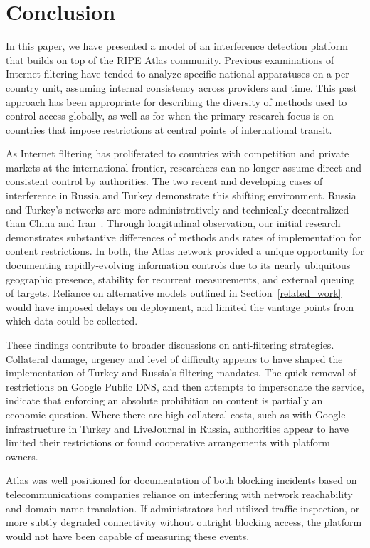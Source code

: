 \section{Conclusion}
\label{sec:conclusion}

In this paper, we have presented a model of an interference detection
platform that builds on top of the RIPE Atlas community. Previous
examinations of Internet filtering have tended to analyze specific
national apparatuses on a per-country unit, assuming internal
consistency across providers and time. This past approach has been
appropriate for describing the diversity of methods used to control
access globally, as well as for when the primary research focus is on
countries that impose restrictions at central points of international
transit. 

As Internet filtering has proliferated to countries with competition and
private markets at the international frontier, researchers can no longer
assume direct and consistent control by authorities. The two recent and
developing cases of interference in Russia and Turkey demonstrate this
shifting environment. Russia and Turkey's networks are more
administratively and technically decentralized than China and
Iran~\cite{Roberts2011}. Through longitudinal observation, our initial
research demonstrates substantive differences of methods ands rates of
implementation for content restrictions. In both, the Atlas network
provided a unique opportunity for documenting rapidly-evolving
information controls due to its nearly ubiquitous geographic presence,
stability for recurrent measurements, and external queuing of targets.
Reliance on alternative models outlined in Section~\ref{related_work}
would have imposed delays on deployment, and limited the vantage points
from which data could be collected. 

These findings contribute to broader discussions on anti-filtering
strategies.  Collateral damage, urgency and level of difficulty appears
to have shaped the implementation of Turkey and Russia's filtering
mandates. The quick removal of restrictions on Google Public DNS, and
then attempts to impersonate the service, indicate that enforcing an
absolute prohibition on content is partially an economic question. Where
there are high collateral costs, such as with Google infrastructure in
Turkey and LiveJournal in Russia, authorities appear to have limited
their restrictions or found cooperative arrangements with platform
owners. 

Atlas was well positioned for documentation of both blocking incidents
based on telecommunications companies reliance on interfering with
network reachability and domain name translation. If administrators had
utilized traffic inspection, or more subtly degraded connectivity
without outright blocking access, the platform would not have been
capable of measuring these events.

